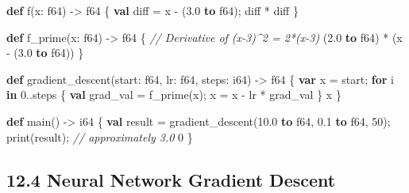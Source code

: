 \documentclass[
  english,
]{book}
\newenvironment{Shaded}{\begin{snugshade}}{\end{snugshade}}
\newcommand{\CommentTok}[1]{\textcolor[rgb]{0.42,0.60,0.33}{\textit{#1}}}
\newcommand{\ControlFlowTok}[1]{\textcolor[rgb]{0.77,0.53,0.75}{\textbf{#1}}}
\newcommand{\DataTypeTok}[1]{\textcolor[rgb]{0.31,0.79,0.69}{#1}}
\newcommand{\DecValTok}[1]{\textcolor[rgb]{0.71,0.81,0.66}{#1}}
\newcommand{\FloatTok}[1]{\textcolor[rgb]{0.71,0.81,0.66}{#1}}
\newcommand{\FunctionTok}[1]{\textcolor[rgb]{0.86,0.86,0.67}{#1}}
\newcommand{\KeywordTok}[1]{\textcolor[rgb]{0.34,0.61,0.84}{\textbf{#1}}}
\newcommand{\NormalTok}[1]{\textcolor[rgb]{0.83,0.83,0.83}{#1}}
\newcommand{\OperatorTok}[1]{\textcolor[rgb]{0.83,0.83,0.83}{#1}}
\begin{document}
\begin{Shaded}
\begin{Highlighting}[]
\KeywordTok{def}\NormalTok{ f(x: }\DataTypeTok{f64}\NormalTok{) }\OperatorTok{{-}\textgreater{}} \DataTypeTok{f64}\NormalTok{ \{}
    \KeywordTok{val}\NormalTok{ diff }\OperatorTok{=}\NormalTok{ x }\OperatorTok{{-}}\NormalTok{ (}\FloatTok{3.0} \KeywordTok{to} \DataTypeTok{f64}\NormalTok{);}
\NormalTok{    diff }\OperatorTok{*}\NormalTok{ diff}
\NormalTok{\}}

\KeywordTok{def}\NormalTok{ f\_prime(x: }\DataTypeTok{f64}\NormalTok{) }\OperatorTok{{-}\textgreater{}} \DataTypeTok{f64}\NormalTok{ \{}
    \CommentTok{// Derivative of (x{-}3)\^{}2 = 2*(x{-}3)}
\NormalTok{    (}\FloatTok{2.0} \KeywordTok{to} \DataTypeTok{f64}\NormalTok{) }\OperatorTok{*}\NormalTok{ (x }\OperatorTok{{-}}\NormalTok{ (}\FloatTok{3.0} \KeywordTok{to} \DataTypeTok{f64}\NormalTok{))}
\NormalTok{\}}

\KeywordTok{def}\NormalTok{ gradient\_descent(start: }\DataTypeTok{f64}\NormalTok{, lr: }\DataTypeTok{f64}\NormalTok{, steps: }\DataTypeTok{i64}\NormalTok{) }\OperatorTok{{-}\textgreater{}} \DataTypeTok{f64}\NormalTok{ \{}
    \KeywordTok{var}\NormalTok{ x }\OperatorTok{=}\NormalTok{ start;}
    \ControlFlowTok{for}\NormalTok{ i }\ControlFlowTok{in} \DecValTok{0}\OperatorTok{..}\NormalTok{steps \{}
        \KeywordTok{val}\NormalTok{ grad\_val }\OperatorTok{=}\NormalTok{ f\_prime(x);}
\NormalTok{        x }\OperatorTok{=}\NormalTok{ x }\OperatorTok{{-}}\NormalTok{ lr }\OperatorTok{*}\NormalTok{ grad\_val}
\NormalTok{    \}}
\NormalTok{    x}
\NormalTok{\}}

\KeywordTok{def}\NormalTok{ main() }\OperatorTok{{-}\textgreater{}} \DataTypeTok{i64}\NormalTok{ \{}
    \KeywordTok{val} \DataTypeTok{result} \OperatorTok{=}\NormalTok{ gradient\_descent(}\FloatTok{10.0} \KeywordTok{to} \DataTypeTok{f64}\NormalTok{, }\FloatTok{0.1} \KeywordTok{to} \DataTypeTok{f64}\NormalTok{, }\DecValTok{50}\NormalTok{);}
    \FunctionTok{print}\NormalTok{(}\DataTypeTok{result}\NormalTok{);   }\CommentTok{// approximately 3.0}
    \DecValTok{0}
\NormalTok{\}}
\end{Highlighting}
\end{Shaded}

\subsection{12.4 Neural Network Gradient
Descent}\label{neural-network-gradient-descent}
\end{document}
